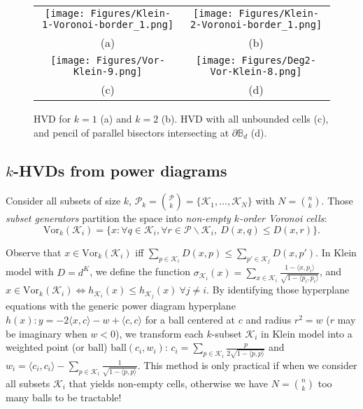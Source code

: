\documentclass[12pt]{article}
\def\st{:}
\def\ball{\mathrm{ball}}
\def\calP{\mathcal{P}}
\def\calK{\mathcal{K}}
\def\bbB{\mathbb{B}}
\def\inner#1#2{{\langle #1,#2\rangle}}
\def\Vor{\mathrm{Vor}}
\def\bbB{\mathbb{B}}
\begin{document}
\def\ttt{0.33\columnwidth}
\begin{figure}\centering
\begin{tabular}{cc}
\texttt{[image: Figures/Klein-1-Voronoi-border\_1.png]} &
\texttt{[image: Figures/Klein-2-Voronoi-border\_1.png]} \\
(a) & (b) \\
\texttt{[image: Figures/Vor-Klein-9.png]} &
\texttt{[image: Figures/Deg2-Vor-Klein-8.png]} \\
(c) & (d)
\end{tabular}
\caption{HVD for $k=1$ (a) and $k=2$ (b).
HVD with all unbounded cells (c), and pencil of parallel bisectors intersecting at $\partial\bbB_d$ (d).
}\label{fig:example}\end{figure}


\subsection{$k$-HVDs from power diagrams}

Consider all subsets of size $k$, $\calP_k={\calP\choose k}=\{\calK_1, ..., \calK_N\}$ with $N={n\choose k}$.
Those {\em subset generators} partition the space into {\em non-empty $k$-order Voronoi cells}: 
$$
\Vor_k(\calK_i) = \{x\st \forall q\in\calK_i, \forall r\in \calP\backslash\calK_i,\ D(x,q)\leq D(x,r)\}.
$$

Observe that $x\in\Vor_k(\calK_i)$ iff $\sum_{p\in\calK_i} D(x,p) \leq \sum_{p'\in\calK_j} D(x,p')$.
In Klein model with $D=d^K$, we define the function $\sigma_{\calK_i}(x) = \sum_{x\in \calK_i} \frac{1-\inner{x}{p_i}}{\sqrt{1-\inner{p_i}{p_i}}}$, and
$x\in\Vor_k(\calK_i) \Leftrightarrow h_{\calK_i}(x)\leq h_{\calK_j}(x)\ \forall j\not=i$.
By identifying those hyperplane equations with the generic power diagram hyperplane $h(x): y=-2\inner{x}{c}-w+\inner{c}{c}$ for a ball centered at $c$ and radius $r^2=w$ ($r$ may be imaginary when $w<0$), we transform each $k$-subset $\calK_i$ in Klein model into a weighted point (or ball) $\ball(c_i,w_i)$:
$c_i=\sum_{p\in\calK_i} \frac{p}{2\sqrt{1-\inner{p}{p}}}$ and $w_i=\inner{c_i}{c_i}- \sum_{p\in\calK_i} \frac{1}{\sqrt{1-\inner{p}{p}}}$.
This method is only practical if when we consider all subsets $\calK_i$ that yields non-empty cells, otherwise we have $N={n\choose k}$ too many balls to be tractable!
\end{document}
